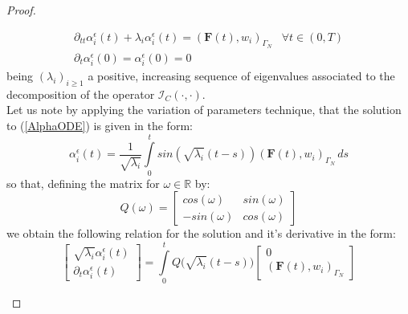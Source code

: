 \begin{proof}
\begin{enumerate}
    \begin{equation}
        \label{AlphaODE}
        \begin{array}{cc}
            \partial_{tt} \alpha_i^{\epsilon}(t) + \lambda_i \alpha_i^{\epsilon}(t) = (\mathbf{F}(t),w_i)_{\Gamma_N}& \forall t \in (0,T) \\
            \partial_t \alpha_i^{\epsilon}(0) = \alpha_i^{\epsilon}(0) = 0 & 
        \end{array}
    \end{equation}
    being $(\lambda_i)_{i \geq 1}$ a positive, increasing sequence of eigenvalues associated to the decomposition of the operator $\mathcal{I}_C(\cdot, \cdot)$.\\
    Let us note by applying the variation of parameters technique, that the solution to (\ref{AlphaODE}) is given in the form:
    \begin{equation}
        \label{AlphaODEsol}
        \alpha_i^{\epsilon} (t) = \frac{1}{\sqrt{\lambda_i}} \int\limits_0^t sin(\sqrt{\lambda_i} (t-s)) (\mathbf{F}(t),w_i)_{\Gamma_N} \, ds
    \end{equation}
    so that, defining the matrix for $\omega \in \mathbb{R}$ by:
    \begin{equation*}
        Q(\omega) =
        \begin{bmatrix}
        cos(\omega) & sin(\omega) \\
        -sin(\omega) & cos(\omega)
        \end{bmatrix}
    \end{equation*}
    we obtain the following relation for the solution and it's derivative in the form:
    \begin{equation}
        \label{MatrixODEsol}
        \begin{bmatrix}
        \sqrt{\lambda_i} \alpha_i^{\epsilon}(t) \\
        \partial_{t} \alpha_i^{\epsilon}(t) 
        \end{bmatrix}
        = \int \limits_0^t Q\big(\sqrt{\lambda_i}(t-s)\big)
        \begin{bmatrix}
        0 \\
        (\mathbf{F}(t),w_i)_{\Gamma_N}
        \end{bmatrix}
    \end{equation}
    

\end{enumerate}
\end{proof}
